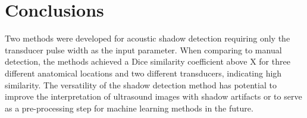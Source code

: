 \documentclass[preprint,5p,authoryear]{elsarticle}
\begin{document}
\section*{Conclusions}
\label{Conclusions}
Two methods were developed for acoustic shadow detection requiring only the transducer pulse width as the input parameter. When comparing to manual detection, the methods achieved a Dice similarity coefficient above X for three different anatomical locations and two different transducers, indicating high similarity. The versatility of the shadow detection method has potential to improve the interpretation of ultrasound images with shadow artifacts or to serve as a pre-processing step for machine learning methods in the future.
        










\end{document}
